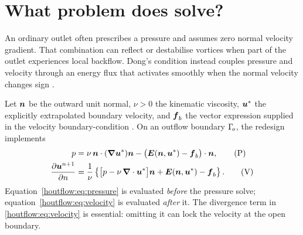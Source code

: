 \begin{center}
\end{center}

\section{What problem does \HOutflow{} solve?}

An ordinary outlet often prescribes a pressure and assumes zero normal
velocity gradient.  That combination can reflect or destabilise vortices
when part of the outlet experiences local backflow.  Dong's condition instead
couples pressure and velocity through an energy flux that activates smoothly
when the normal velocity changes sign \cite{DongKC2014}.

Let $\boldsymbol{n}$ be the outward unit normal, $\nu>0$ the kinematic viscosity,
$\boldsymbol{u}^*$ the explicitly extrapolated boundary velocity, and $\boldsymbol{f}_b$
the vector expression supplied in the velocity boundary-condition
.  On an outflow boundary $\Gamma_{\!o}$, the redesign implements
\begin{align}
  p
  &= \nu\,\boldsymbol{n}\cdot(\boldsymbol{\nabla}\boldsymbol{u}^*)\boldsymbol{n}
     - \bigl(\boldsymbol{E}(\boldsymbol{n},\boldsymbol{u}^*)-\boldsymbol{f}_b\bigr)\cdot\boldsymbol{n},
     \label{houtflow:eq:pressure}\tag{P}\\
  \frac{\partial\boldsymbol{u}^{n+1}}{\partial n}
  &= \frac{1}{\nu}
     \left\{
       \bigl[p-\nu\,\boldsymbol{\nabla}\cdot\boldsymbol{u}^*\bigr]\boldsymbol{n}
       +\boldsymbol{E}(\boldsymbol{n},\boldsymbol{u}^*)-\boldsymbol{f}_b
     \right\}.
     \label{houtflow:eq:velocity}\tag{V}
\end{align}
Equation~\eqref{houtflow:eq:pressure} is evaluated \emph{before} the pressure solve;
equation~\eqref{houtflow:eq:velocity} is evaluated \emph{after} it.  The divergence
term in \eqref{houtflow:eq:velocity} is essential: omitting it can lock the velocity
at the open boundary.

